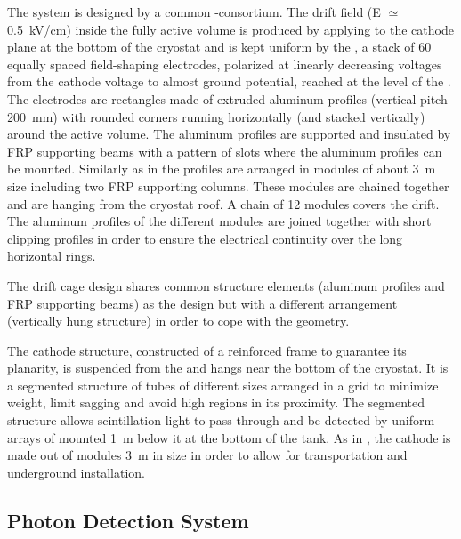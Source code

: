 The  system is designed by a common \single{}-\dual consortium.
The drift field (E ${\simeq}$ \SI{0.5}{kV/cm}) inside the fully active \lar volume is produced by applying  to the cathode plane at the bottom of the cryostat and is kept uniform by the , a stack of \num{60} equally spaced field-shaping electrodes,  polarized at linearly decreasing voltages from the cathode  voltage to almost ground potential, reached at the level of the . The electrodes are rectangles made of extruded aluminum profiles (vertical pitch \SI{200}{mm}) with rounded corners running horizontally (and stacked vertically) around the active volume. The aluminum profiles are supported and insulated by FRP supporting beams with a pattern of slots where the aluminum profiles can be mounted. Similarly as in  the profiles are arranged in modules of about \SI{3}{m} size including two FRP supporting columns. These modules are chained together and  are hanging from the cryostat roof. A chain of \num{12} modules covers the \dpmaxdrift drift. The aluminum profiles of the different modules are joined together with short clipping profiles in order to ensure the electrical continuity over the
\dptpclen long horizontal rings. 


The drift cage design shares common structure elements (aluminum profiles and FRP supporting beams) as the \single {} design but with a different arrangement (vertically hung structure) in order to cope with the  geometry.

The cathode structure, constructed of a reinforced frame to guarantee its planarity, is suspended from the  and hangs near the 
bottom of the cryostat. It is a segmented structure of tubes of different sizes  arranged in a grid to minimize weight, limit sagging and avoid high \efield
regions in its proximity.  The segmented structure allows scintillation light to pass through and be detected by uniform arrays of  mounted \SI{1}{m} below it at the bottom of the tank. As in , the cathode is made out of modules \SI{3}{m} in size in order to allow for transportation and underground installation. 

\subsection{Photon Detection System}
\label{v4:fddp-ov:pd}

